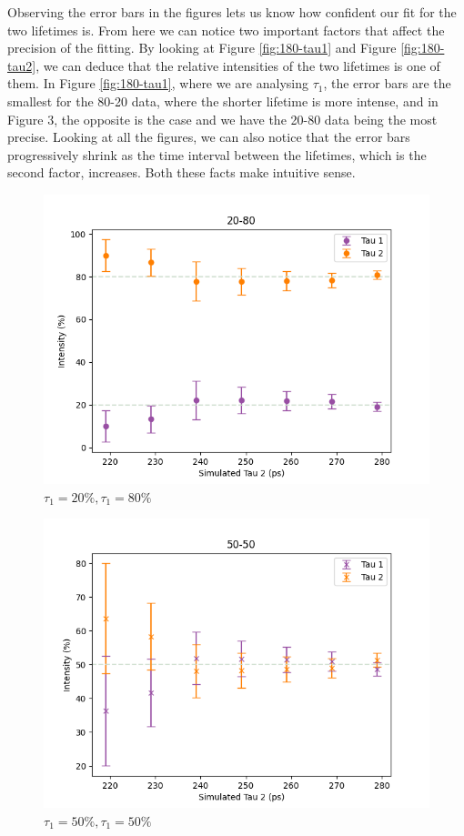 Observing the error bars in the figures lets us know how confident our fit for the two lifetimes is. From here we can notice two important factors that affect the precision of the fitting. By looking at Figure \ref{fig:180-tau1} and Figure \ref{fig:180-tau2}, we can deduce that the relative intensities of the two lifetimes is one of them. In Figure \ref{fig:180-tau1}, where we are analysing $\tau_1$, the error bars are the smallest for the 80-20 data, where the shorter lifetime is more intense, and in Figure 3, the opposite is the case and we have the 20-80 data being the most precise. Looking at all the figures, we can also notice that the error bars progressively shrink as the time interval between the lifetimes, which is the second factor, increases. Both these facts make intuitive sense.

\begin{figure}
    \centering
    \includegraphics[width=0.8\linewidth]{Batch 1+2/2080.png}
    \caption{$\tau_1 = 20\%, \tau_1 = 80\%$}
    \label{fig:180-2080}
\end{figure}

\begin{figure}
    \centering
    \includegraphics[width=0.8\linewidth]{Batch 1+2/5050.png}
    \caption{$\tau_1 = 50\%, \tau_1 = 50\%$}
    \label{fig:180-5050}
\end{figure}

